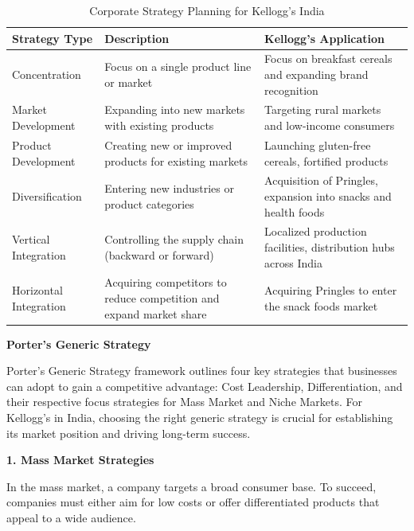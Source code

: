 \documentclass[10pt,a4paper]{book}
\begin{document}
\begin{table}[H]
\centering
\begin{tabular}{|p{2.5cm}|p{8.5cm}|p{5.5cm}|}
\hline
\textbf{Strategy Type} & \textbf{Description} & \textbf{Kellogg's Application} \\ \hline
Concentration & Focus on a single product line or market & Focus on breakfast cereals and expanding brand recognition \\ \hline
Market Development & Expanding into new markets with existing products & Targeting rural markets and low-income consumers \\ \hline
Product Development & Creating new or improved products for existing markets & Launching gluten-free cereals, fortified products \\ \hline
Diversification & Entering new industries or product categories & Acquisition of Pringles, expansion into snacks and health foods \\ \hline
Vertical Integration & Controlling the supply chain (backward or forward) & Localized production facilities, distribution hubs across India \\ \hline
Horizontal Integration & Acquiring competitors to reduce competition and expand market share & Acquiring Pringles to enter the snack foods market \\ \hline
\end{tabular}
\caption{Corporate Strategy Planning for Kellogg’s India}
\end{table}

\vspace{0.5cm}

\textbf{Porter's Generic Strategy}

Porter's Generic Strategy framework outlines four key strategies that businesses can adopt to gain a competitive advantage: Cost Leadership, Differentiation, and their respective focus strategies for Mass Market and Niche Markets. For Kellogg's in India, choosing the right generic strategy is crucial for establishing its market position and driving long-term success.

\vspace{0.5cm}

\textbf{1. Mass Market Strategies}

In the mass market, a company targets a broad consumer base. To succeed, companies must either aim for low costs or offer differentiated products that appeal to a wide audience.

\vspace{0.5cm}
\end{document}

